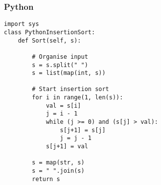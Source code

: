 \subsubsection{Python}
\lstset{style=python}
\begin{lstlisting}
import sys
class PythonInsertionSort:
    def Sort(self, s):

        # Organise input
        s = s.split(" ")
        s = list(map(int, s))

        # Start insertion sort
        for i in range(1, len(s)):
            val = s[i]
            j = i - 1
            while (j >= 0) and (s[j] > val):
                s[j+1] = s[j]
                j = j - 1
            s[j+1] = val

        s = map(str, s)
        s = " ".join(s)
        return s
\end{lstlisting}

